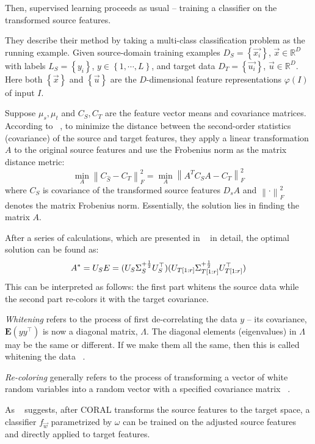 Then, supervised learning proceeds as usual -- training a classifier on the transformed source features.

They describe their method by taking a multi-class classification problem as the running example. Given source-domain training examples $D_S = \left \{ \overrightarrow{x_i} \right \}$, $\overrightarrow{x} \in \mathbb{R}^{D}$ with labels $L_S = \left \{ y_i \right \}$, $ y \in \left \{ {1, \cdots, L} \right \}$, and target data $D_T = \left \{ \overrightarrow{u_i} \right \}$, $\overrightarrow{u} \in \mathbb{R}^{D}$. Here both $\left \{ \overrightarrow{x} \right \}$ and $\left \{ \overrightarrow{u} \right \}$ are the $D$-dimensional feature representations $\varphi(I)$ of input $I$.

Suppose $\mu_s, \mu_t$ and $C_S, C_T$ are the feature vector means and covariance matrices. According to ~\citep{coral}, to minimize the distance between the second-order statistics (covariance) of the source and target features, they apply a linear transformation $A$ to the original source features and use the Frobenius norm as the matrix distance metric: \[ \min_{A} \left \| C_{\hat{S}} - C_T \right \| _{F}^{2} = \min_{A} \left \| A^{T}C_{S}A - C_T \right \| _{F}^{2} \] where $C_S$ is covariance of the transformed source features $D_{s}A$ and $\left \| \cdot   \right \| _{F}^{2}$ denotes the matrix Frobenius norm. Essentially, the solution lies in finding the matrix $A$.

After a series of calculations, which are presented in ~\citep{coral} in detail, the optimal solution can be found as: \[ A^{*} = U_{S}E \\ = (U_{S}\Sigma_{S}^{+\frac{1}{2}}U_{S}^\top)(U_{T[1:r]}\Sigma_{T[1:r]}^{+\frac{1}{2}}U_{T[1:r]}^\top) \] 
This can be interpreted as follows: the first part whitens the source data while the second part re-colors it with the target covariance. 

\textit{Whitening} refers to the process of first de-correlating the data $y$ -- its covariance, $\mathbf{E}(yy^\top)$ is now a diagonal matrix, $\Lambda$. The diagonal elements (eigenvalues) in $\Lambda$ may be the same or different. If we make them all the same, then this is called whitening the data ~\citep{rosalind}. 

\textit{Re-coloring} generally refers to the process of transforming a vector of white random variables into a random vector with a specified covariance matrix ~\citep{miliha}.

As ~\citep{coral} suggests, after CORAL transforms the source features to the target space, a classifier $f_{\overrightarrow{w}}$ parametrized by $\omega$ can be trained on the adjusted source features and directly applied to target features. 

